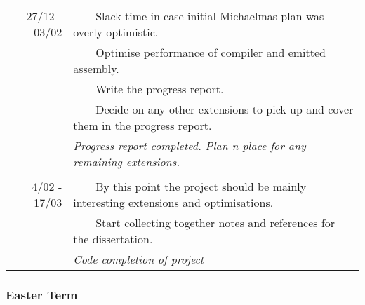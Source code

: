 \documentclass[12pt,a4paper, headings=standardclasses]{scrartcl}
\newcommand{\tabitem}{~~\llap{\textbullet}~~}
\begin{document}
\begin{tabularx}{\textwidth}{rX} \toprule
    27/12 - 03/02
     & \tabitem Slack time in case initial Michaelmas plan was overly optimistic.                    \\
     & \tabitem Optimise performance of compiler and emitted assembly.                               \\
     & \tabitem Write the progress report.                                                           \\
     & \tabitem Decide on any other extensions to pick up and cover them in the progress report.     \\
     & \textit{Progress report completed. Plan n place for any remaining extensions.}                \\

     &                                                                                               \\

    4/02 - 17/03
     & \tabitem By this point the project should be mainly interesting extensions and optimisations. \\
     & \tabitem Start collecting together notes and references for the dissertation.                 \\
     & \textit{Code completion of project}                                                           \\
    \bottomrule
\end{tabularx}

\subsubsection*{Easter Term}
\end{document}
